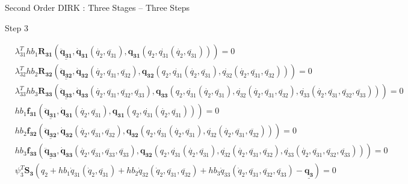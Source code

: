 \documentclass{beamer}
\begin{document}
\begin{frame}[allowframebreaks]{Second Order DIRK : Three Stages -- Three Steps}
\tiny{
\begin{block}{Step 3}
  \begin{minipage}{1.0\textwidth}
    \begin{minipage}{1.0\textwidth}
      \begin{equation}\nonumber
        \begin{split}
          &\lambda_{31}^T h b_1 \mathbf{R_{31}}\left(\underline{\mathbf{\ddot{q}_{31}}},
          \mathbf{\dot{q}_{31}}(\dot{q_2},\ddot{q_{31}}),
              \mathbf{{q}_{31}}(q_2,\dot{q_{31}}(\dot{q_2},\ddot{q_{31}}))\right) = 0 \\
          &\lambda_{32}^T h b_2  \mathbf{R_{32}}\left(\underline{\mathbf{\ddot{q}_{32}}},
              \mathbf{\dot{q}_{32}}(\dot{q_2},\ddot{q_{31}},\ddot{q_{32}}),
          \mathbf{{q}_{32}}(q_2,\dot{q_{31}}(\dot{q_2},\ddot{q_{31}}),\dot{q_{32}}(\dot{q_2},\ddot{q_{31}},\ddot{q_{32}}))\right) = 0 \\
          &\lambda_{33}^T h b_3 \mathbf{R_{33}} \left(\underline{\mathbf{\ddot{q}_{33}}},
              \mathbf{\dot{q}_{33}}(\dot{q_2},\ddot{q_{31}},\ddot{q_{32}},\ddot{q_{33}}),
          \mathbf{{q}_{33}}(q_2,\dot{q_{31}}(\dot{q_2},\ddot{q_{31}}),\dot{q_{32}}(\dot{q_2},\ddot{q_{31}},\ddot{q_{32}}),\dot{q_{33}}(\dot{q_2},\ddot{q_{31}},\ddot{q_{32}},\ddot{q_{33}}))\right) = 0\\
          &h b_1 \mathbf{f_{31}}\left(\underline{\mathbf{\ddot{q}_{31}}},
          \mathbf{\dot{q}_{31}}(\dot{q_2},\ddot{q_{31}}),
              \mathbf{{q}_{31}}(q_2,\dot{q_{31}}(\dot{q_2},\ddot{q_{31}}))\right) = 0 \\
          &h b_2 \mathbf{f_{32}}\left(\underline{\mathbf{\ddot{q}_{32}}},
              \mathbf{\dot{q}_{32}}(\dot{q_2},\ddot{q_{31}},\ddot{q_{32}}),
          \mathbf{{q}_{32}}(q_2,\dot{q_{31}}(\dot{q_2},\ddot{q_{31}}),\dot{q_{32}}(\dot{q_2},\ddot{q_{31}},\ddot{q_{32}}))\right) = 0\\
          &h b_3 \mathbf{f_{33}}\left(\underline{\mathbf{\ddot{q}_{33}}},
              \mathbf{\dot{q}_{33}}(\dot{q_2},\ddot{q_{31}},\ddot{q_{33}},\ddot{q_{33}}),
          \mathbf{{q}_{32}}(q_2,\dot{q_{31}}(\dot{q_2},\ddot{q_{31}}),\dot{q_{32}}(\dot{q_2},\ddot{q_{31}},\ddot{q_{32}}),\dot{q_{33}}(\dot{q_2},\ddot{q_{31}},\ddot{q_{32}},\ddot{q_{33}}))\right) = 0\\
          &\psi_3^T \mathbf{S_3}(q_2 + h b_1 \dot{q}_{31}(\dot{q}_2,\ddot{q_{31}}) +  h b_2 \dot{q}_{32}(\dot{q}_2,\ddot{q_{31}},\ddot{q_{32}}) +  h b_3 \dot{q}_{33}(\dot{q}_2,\ddot{q_{31}},\ddot{q_{32}},\ddot{q_{33}}) - \underline{\mathbf{q_3}} ) = 0\\

\end{split}
\end{equation}
\end{minipage}
\end{minipage}
\end{block}}
\end{frame}
\end{document}
